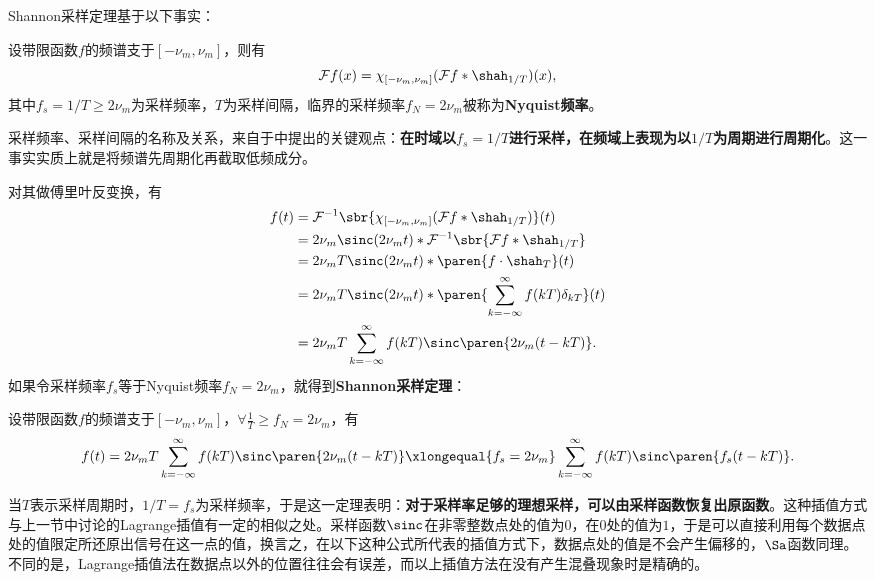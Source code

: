 Shannon采样定理基于以下事实：
\begin{theorem}[采样定理]
    设带限函数$f$的频谱支于$[-\nu_m,\nu_m]$，则有
    \begin{equation}
        \mathcal{F}f(x)=\chi_{[-\nu_m,\nu_m]}(\mathcal{F}f*\shah_{1/T})(x),
    \end{equation}
    其中$f_s=1/T\geq 2\nu_m$为采样频率，$T$为采样间隔，临界的采样频率$f_N=2\nu_m$被称为\textbf{Nyquist频率}。
\end{theorem}

采样频率、采样间隔的名称及关系，来自于中提出的关键观点：\textbf{在时域以$f_s=1/T$进行采样，在频域上表现为以$1/T$为周期进行周期化}。这一事实实质上就是将频谱先周期化再截取低频成分。

对其做傅里叶反变换，有
\begin{align}
    f(t)&=\mathcal{F}^{-1}\sbr{\chi_{[-\nu_m,\nu_m]}(\mathcal{F}f*\shah_{1/T})}(t)\nonumber\\
    &=2\nu_m\sinc(2\nu_m t)*\mathcal{F}^{-1}\sbr{\mathcal{F}f*\shah_{1/T}}\nonumber\\
    &=2\nu_m T\sinc(2\nu_m t)*\paren{f\cdot\shah_T}(t)\nonumber\\
    &=2\nu_m T\sinc(2\nu_m t)*\paren{\sum_{k=-\infty}^{\infty}f(kT)\delta_{kT}}(t)\nonumber\\
    &=2\nu_m T\sum_{k=-\infty}^{\infty}f(kT)\sinc\paren{2\nu_m (t-kT)}.
\end{align}
如果令采样频率$f_s$等于Nyquist频率$f_N=2\nu_m$，就得到\textbf{Shannon采样定理}：
\begin{theorem}[Shannon采样定理]
    设带限函数$f$的频谱支于$[-\nu_m,\nu_m]$，$\forall \displaystyle\frac{1}{T}\geq f_N=2\nu_m$，有
    \begin{equation}
        f(t)=2\nu_m T\sum_{k=-\infty}^{\infty}f(kT)\sinc\paren{2\nu_m (t-kT)}\xlongequal{f_s=2\nu_m} \sum_{k=-\infty}^{\infty}f(kT)\sinc\paren{f_s(t-kT)}.
    \end{equation}
\end{theorem}
当$T$表示采样周期时，$1/T=f_s$为采样频率，于是这一定理表明：\textbf{对于采样率足够的理想采样，可以由采样函数恢复出原函数}。这种插值方式与上一节中讨论的Lagrange插值有一定的相似之处。采样函数$\sinc$在非零整数点处的值为$0$，在$0$处的值为$1$，于是可以直接利用每个数据点处的值限定所还原出信号在这一点的值，换言之，在以下这种公式所代表的插值方式下，数据点处的值是不会产生偏移的，$\Sa$函数同理。不同的是，Lagrange插值法在数据点以外的位置往往会有误差，而以上插值方法在没有产生混叠现象时是精确的。

